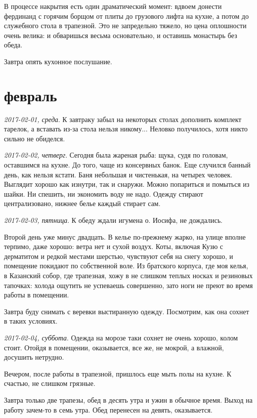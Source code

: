 \documentclass[
    12pt
    ,a4paper
    ,oneside
    ,russian
]{memoir}
\newcommand{\mydatestamp}{
    \bigskip   %
    \emph
}
\newcommand{\mds}{\mydatestamp}
\begin{document}
    В процессе накрытия есть один драматический момент: вдвоем донести фердинанд с горячим борщом от плиты до грузового лифта на кухне, а потом до служебного стола в трапезной. Это не запредельно тяжело, но цена оплошности очень велика: и обваришься весьма основательно, и оставишь монастырь без обеда.
    
    Завтра опять кухонное послушание.
    
    \section*{февраль}
    
    \mds{2017-02-01, среда}. К завтраку забыл на некоторых столах дополнить комплект тарелок, а вставать из-за стола нельзя никому... Неловко получилось, хотя никто сильно не обиделся.
    
    \mds{2017-02-02, четверг}. Сегодня была жареная рыба: щука, судя по головам, оставшимся на кухне. До того, чаще из консервных банок. Еще случился банный день, как нельзя кстати. Баня небольшая и чистенькая, на четырех человек. Выглядит хорошо как изнутри, так и снаружи. Можно попариться и помыться из шайки. Ни спешить, ни экономить воду не надо. Одежду стирают централизовано, нижнее белье каждый стирает сам.
    
    \mds{2017-02-03, пятница}. К обеду ждали игумена о. Иосифа, не дождались.
    
    Второй день уже минус двадцать. В келье по-прежнему жарко, на улице вполне терпимо, даже хорошо: ветра нет и сухой воздух. Коты, включая Кузю с дерматитом и редкой местами шерстью, чувствуют себя на снегу хорошо, и помещение покидают по собственной воле. Из братского корпуса, где моя келья, в Казанский собор, где трапезная, хожу в не слишком теплых носках и резиновых тапочках: холода ощутить не успеваешь совершенно, зато ноги не преют во время работы в помещении.
    
    Завтра буду снимать с веревки выстиранную одежду. Посмотрим, как она сохнет в таких условиях.
    
    \mds{2017-02-04, суббота}. Одежда на морозе таки сохнет не очень хорошо, колом стоит. Отойдя в помещении, оказывается, все же, не мокрой, а влажной, досушить нетрудно.
    
    Вечером, после работы в трапезной, пришлось еще мыть полы на кухне. К счастью, не слишком грязные.
    
    Завтра только две трапезы, обед в десять утра и ужин в обычное время. Выход на работу зачем-то в семь утра. Обед перенесен на девять, оказывается.
    
\end{document}
